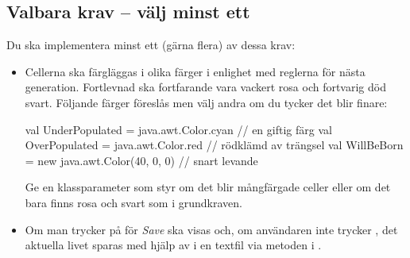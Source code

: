 \subsection{Valbara krav -- välj minst ett}

Du ska implementera minst ett (gärna flera) av dessa krav:
\begin{itemize}[nosep, label={$\square$}]
\item Cellerna ska färgläggas i olika färger i enlighet med reglerna för nästa generation. Fortlevnad ska fortfarande vara vackert rosa och fortvarig död svart. Följande färger föreslås men välj andra om du tycker det blir finare:
\begin{CodeSmall}
  val UnderPopulated = java.awt.Color.cyan  // en giftig färg
  val OverPopulated  = java.awt.Color.red   // rödklämd av trängsel
  val WillBeBorn     = new java.awt.Color(40, 0, 0)  // snart levande
\end{CodeSmall}
Ge  en klassparameter  som styr om det blir mångfärgade celler eller om det bara finns rosa och svart som i grundkraven.

\item Om man trycker på  för \emph{Save} ska  visas och, om användaren inte trycker , det aktuella livet sparas med hjälp av  i en textfil via metoden  i .


\end{itemize}
